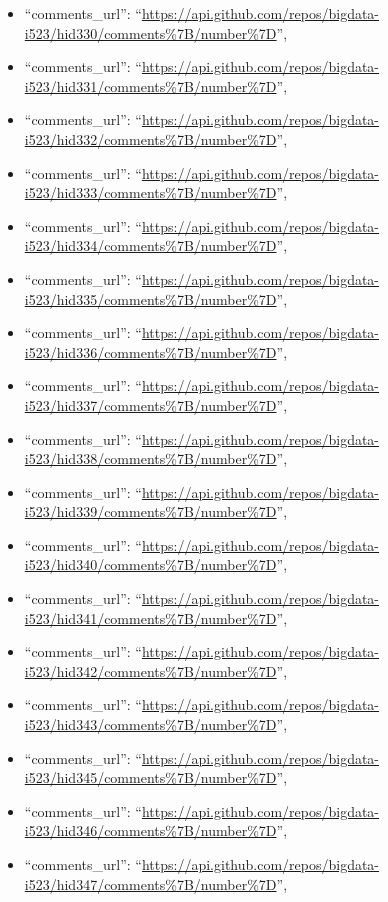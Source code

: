 \begin{itemize}
\item
  ``comments\_url'':
  ``\url{https://api.github.com/repos/bigdata-i523/hid330/comments\%7B/number\%7D}'',
\item
  ``comments\_url'':
  ``\url{https://api.github.com/repos/bigdata-i523/hid331/comments\%7B/number\%7D}'',
\item
  ``comments\_url'':
  ``\url{https://api.github.com/repos/bigdata-i523/hid332/comments\%7B/number\%7D}'',
\item
  ``comments\_url'':
  ``\url{https://api.github.com/repos/bigdata-i523/hid333/comments\%7B/number\%7D}'',
\item
  ``comments\_url'':
  ``\url{https://api.github.com/repos/bigdata-i523/hid334/comments\%7B/number\%7D}'',
\item
  ``comments\_url'':
  ``\url{https://api.github.com/repos/bigdata-i523/hid335/comments\%7B/number\%7D}'',
\item
  ``comments\_url'':
  ``\url{https://api.github.com/repos/bigdata-i523/hid336/comments\%7B/number\%7D}'',
\item
  ``comments\_url'':
  ``\url{https://api.github.com/repos/bigdata-i523/hid337/comments\%7B/number\%7D}'',
\item
  ``comments\_url'':
  ``\url{https://api.github.com/repos/bigdata-i523/hid338/comments\%7B/number\%7D}'',
\item
  ``comments\_url'':
  ``\url{https://api.github.com/repos/bigdata-i523/hid339/comments\%7B/number\%7D}'',
\item
  ``comments\_url'':
  ``\url{https://api.github.com/repos/bigdata-i523/hid340/comments\%7B/number\%7D}'',
\item
  ``comments\_url'':
  ``\url{https://api.github.com/repos/bigdata-i523/hid341/comments\%7B/number\%7D}'',
\item
  ``comments\_url'':
  ``\url{https://api.github.com/repos/bigdata-i523/hid342/comments\%7B/number\%7D}'',
\item
  ``comments\_url'':
  ``\url{https://api.github.com/repos/bigdata-i523/hid343/comments\%7B/number\%7D}'',
\item
  ``comments\_url'':
  ``\url{https://api.github.com/repos/bigdata-i523/hid345/comments\%7B/number\%7D}'',
\item
  ``comments\_url'':
  ``\url{https://api.github.com/repos/bigdata-i523/hid346/comments\%7B/number\%7D}'',
\item
  ``comments\_url'':
  ``\url{https://api.github.com/repos/bigdata-i523/hid347/comments\%7B/number\%7D}'',

\end{itemize}
